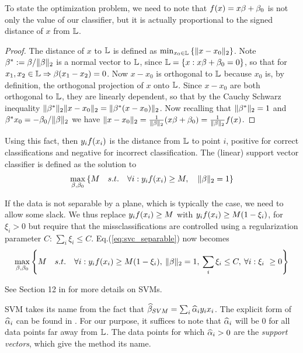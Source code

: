 To state the optimization problem, we need to note that $f(x)=x\beta+\beta_0$ is not only the value of our classifier, but it is actually proportional to the signed distance of $x$ from $\mathbb{L}$. 
\begin{proof}
The distance of $x$ to $\mathbb{L}$ is defined as $\min_{x_0 \in \mathbb{L}} \left\{  \Vert x-x_0 \Vert_2  \right\}$.
Note $\beta^*:=\beta/\Vert \beta \Vert_2$ is a normal vector to $\mathbb{L}$, since $\mathbb{L}=\left\{ x: x\beta+\beta_0=0  \right\}$, so that for $x_1,x_2 \in \mathbb{L} \Rightarrow \beta(x_1-x_2)=0$.
Now $x-x_0$ is orthogonal to $\mathbb{L}$ because $x_0$ is, by definition, the orthogonal projection of $x$ onto $\mathbb{L}$.
Since $x-x_0$ are both orthogonal to $\mathbb{L}$, they are linearly dependent, so that by the Cauchy Schwarz inequality $\Vert \beta^* \Vert_2 \Vert x-x_0 \Vert_2= \Vert \beta^*(x-x_0) \Vert_2$.
Now recalling that $\Vert \beta^* \Vert_2=1$ and $\beta^* x_0=-\beta_0/\Vert \beta \Vert_2$ we have $\Vert x-x_0 \Vert_2=\frac{1}{\Vert \beta \Vert_2} (x\beta+\beta_0)= \frac{1}{\Vert \beta \Vert_2} f(x)$.
\end{proof}

Using this fact, then $y_i f(x_i)$ is the distance from $\mathbb{L}$ to point $i$, positive for correct classifications and negative for incorrect classification. 
The (linear) support vector classifier is defined as the solution to
\begin{align}
\label{eq:svc_separable}
	\max_{\beta,\beta_0} \left\{  
		M \quad s.t. \quad 
		\forall i: y_i f(x_i) \geq M, \quad \Vert \beta \Vert_2=1
	 \right\}
\end{align}

If the data is not separable by a plane, which is typically the case, we need to allow some slack.
We thus replace $y_i f(x_i) \geq M$ with $y_i f(x_i) \geq M(1-\xi_i)$, for $\xi_i>0$ but require that the missclassifications are controlled using a regularization parameter $C$: $\sum_i \xi_i \leq C$.
Eq.(\ref{eq:svc_separable}) now becomes \citep[Eq.(12.25)]{hastie_elements_2003}
\begin{align}
\label{eq:svc_non_separable}
	\max_{\beta,\beta_0} \left\{  
		M \quad s.t. \quad 
		\forall i: y_i f(x_i) \geq M(1-\xi_i), 
		\: \Vert \beta \Vert_2=1, 
		\: \sum_i \xi_i \leq C,
		\:\forall i:\xi_i\ \geq 0
	 \right\}
\end{align}


See Section 12 in \cite{hastie_elements_2003} for more details on SVMs.


\begin{remark}
SVM takes its name from the fact that $\widehat{\beta}_{SVM}=\sum_i \widehat{\alpha}_i y_i x_i$.
The explicit form of $\widehat{\alpha}_i$ can be found in \citep[Section 12.2.1]{hastie_elements_2003}.
For our purpose, it suffices to note that $\widehat{\alpha}_i$ will be $0$ for all data points far away from $\mathbb{L}$.
The data points for which $\widehat{\alpha}_i>0$ are the \emph{support vectors}, which give the method its name.
\end{remark}





